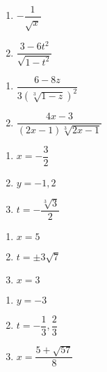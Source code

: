 \documentclass[11pt]{article}
\theoremstyle{definition}  %
\newcounter{HW}
\begin{document}
\begin{multicols}{2}
\begin{enumerate}
\setcounter{enumi}{\value{HW}}

\item  $-\dfrac{1}{\sqrt{x}}$ 

\item  $\dfrac{3-6t^2}{\sqrt{1-t^2}}$

\setcounter{HW}{\value{enumi}}
\end{enumerate}
\end{multicols}

\begin{multicols}{2}
\begin{enumerate}
\setcounter{enumi}{\value{HW}}

\item  $\dfrac{6-8z}{3 (\sqrt[3]{1-z})^2}$


\item  $\dfrac{4x-3}{(2x-1)\sqrt[3]{2x-1}}$  

\setcounter{HW}{\value{enumi}}
\end{enumerate}
\end{multicols}


\begin{multicols}{3}
\begin{enumerate}
\setcounter{enumi}{\value{HW}}

\item  $x = -\dfrac{3}{2}$ 
\item $y = -1, 2$ 
\item  $t = -\dfrac{\sqrt[3]{3}}{2}$ 


\setcounter{HW}{\value{enumi}}
\end{enumerate}
\end{multicols}

\begin{multicols}{3}
\begin{enumerate}
\setcounter{enumi}{\value{HW}}

\item $x = 5$
\item $t = \pm 3 \sqrt{7}$
\item $x=3$     

\setcounter{HW}{\value{enumi}}
\end{enumerate}
\end{multicols}


\begin{multicols}{3}
\begin{enumerate}
\setcounter{enumi}{\value{HW}}

\item  $y=-3$ 
\item  $t = -\dfrac{1}{3}, \dfrac{2}{3}$ 
\item $x = \dfrac{5 + \sqrt{57}}{8}$

\setcounter{HW}{\value{enumi}}
\end{enumerate}
\end{multicols}
\end{document}
